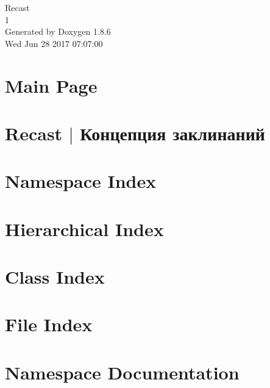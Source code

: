 \documentclass[twoside]{book}
\newcommand{\clearemptydoublepage}{%
  \newpage{\pagestyle{empty}\cleardoublepage}%
}
\begin{document}
\hypersetup{pageanchor=false}
\begin{titlepage}
\vspace*{7cm}
\begin{center}%
{\Large Recast \\[1ex]\large 1 }\\
\vspace*{1cm}
{\large Generated by Doxygen 1.8.6}\\
\vspace*{0.5cm}
{\small Wed Jun 28 2017 07:07:00}\\
\end{center}
\end{titlepage}
\clearemptydoublepage
\tableofcontents
\clearemptydoublepage
{}
\hypersetup{pageanchor=true}

\chapter{Main Page}
\label{index}\hypertarget{index}{}
\chapter{Recast $\vert$ Концепция заклинаний}
\label{md_custom-docs__nodes}
\hypertarget{md_custom-docs__nodes}{}

\chapter{Namespace Index}

\chapter{Hierarchical Index}

\chapter{Class Index}

\chapter{File Index}

\chapter{Namespace Documentation}





\end{document}
